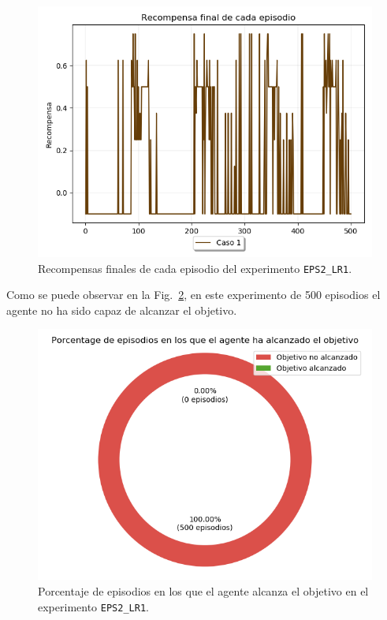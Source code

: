 \begin{figure}
    \centering
    \includegraphics[scale=0.4]{cap5_experimentacion/images/dim5_lr0.001_ep0.2_recompensa.png}
    \caption{Recompensas finales de cada episodio del experimento \texttt{EPS2\_LR1}.}
    \label{fig:dim5_lr0.001_ep0.2_recompensa}
\end{figure}

Como se puede observar en la Fig.~\ref{fig:dim5_lr0.001_ep0.2_porcentajeResuelto}, en este experimento de 500 episodios el agente no ha sido capaz de alcanzar el objetivo.

\begin{figure}
    \centering
    \includegraphics[scale=0.4]{cap5_experimentacion/images/dim5_lr0.001_ep0.2_porcentajeResuelto.png}
    \caption{Porcentaje de episodios en los que el agente alcanza el objetivo en el experimento \texttt{EPS2\_LR1}.}
    \label{fig:dim5_lr0.001_ep0.2_porcentajeResuelto}
\end{figure}


